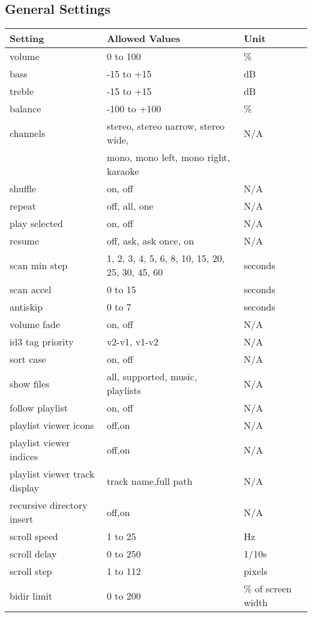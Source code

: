 \subsection{General Settings}
\begin{center}
  \begin{tabular}{@{}lll@{}}\toprule
    \textbf{Setting} & \textbf{Allowed Values} & \textbf{Unit}\\\midrule
     volume & 0 to 100 & \%\\
     bass & -15 to +15 & dB\\
     treble & -15 to +15 &dB\\
     balance & -100 to +100 & \%\\
     channels & stereo, stereo narrow, stereo wide, & N/A\\
              & mono, mono left, mono right, karaoke & \\
     shuffle & on, off & N/A\\
     repeat & off, all, one & N/A\\
     play selected & on, off & N/A\\
     resume & off, ask, ask once, on & N/A\\
     scan min step & 1, 2, 3, 4, 5, 6, 8, 10, 15, 20, 25, 30, 45, 60 & seconds\\
     scan accel & 0 to 15 & seconds\\
     antiskip & 0 to 7 & seconds\\
     volume fade & on, off & N/A\\
     id3 tag priority & v2-v1, v1-v2 & N/A\\
     sort case & on, off & N/A\\
     show files & all, supported, music, playlists & N/A\\
     follow playlist & on, off & N/A\\
     playlist viewer icons & off,on & N/A\\
     playlist viewer indices & off,on & N/A\\
     playlist viewer track display & track name,full path & N/A\\
     recursive directory insert & off,on & N/A\\
     scroll speed & 1 to 25 & Hz\\
     scroll delay & 0 to 250 & 1/10s\\
     scroll step & 1 to 112 & pixels\\
     bidir limit & 0 to 200 & \% of screen width\\

\end{tabular}
\end{center}
